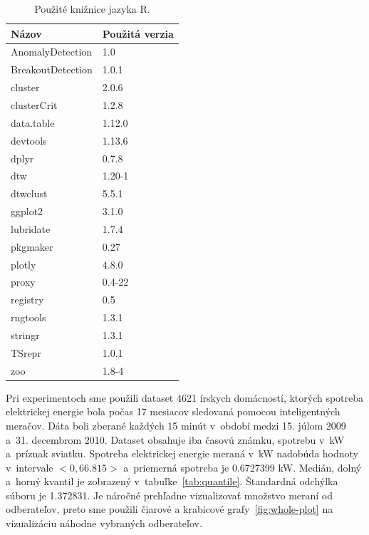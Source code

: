 \documentclass[a4paper,twoside,slovak,12pt,appendix]{article}
\begin{document}
\begin{table}[ht]
  \centering
  \caption{Použité knižnice jazyka R.}
  \label{tab:libraries}
  \begin{tabular}{|l|l|}
    \hline
    \textbf{Názov}  &   \textbf{Použitá verzia}  \\ \hline
    AnomalyDetection    &   1.0         \\ \hline
    BreakoutDetection   &   1.0.1       \\ \hline
    cluster             &   2.0.6       \\ \hline
    clusterCrit         &   1.2.8       \\ \hline
    data.table          &   1.12.0      \\ \hline
    devtools            &   1.13.6      \\ \hline
    dplyr               &   0.7.8       \\ \hline
    dtw                 &   1.20-1      \\ \hline
    dtwclust            &   5.5.1       \\ \hline
    ggplot2             &   3.1.0       \\ \hline
    lubridate           &   1.7.4       \\ \hline
    pkgmaker            &   0.27        \\ \hline
    plotly              &   4.8.0       \\ \hline
    proxy               &   0.4-22      \\ \hline
    registry            &   0.5         \\ \hline
    rngtools            &   1.3.1       \\ \hline
    stringr             &   1.3.1       \\ \hline
    TSrepr              &   1.0.1       \\ \hline
    zoo                 &   1.8-4       \\ \hline
  \end{tabular}
\end{table}

Pri experimentoch sme použili dataset 4621 írskych domácností, ktorých spotreba
elektrickej energie bola počas 17 mesiacov sledovaná pomocou inteligentných
meračov. Dáta boli zberané každých 15 minút v~období medzi 15. júlom 2009 a~31.
decembrom 2010. Dataset obsahuje iba časovú známku, spotrebu v~kW a~príznak
sviatku. Spotreba elektrickej energie meraná v~kW nadobúda hodnoty v~intervale
$<0, 66.815>$ a~priemerná spotreba je 0.6727399 kW. Medián, dolný a~horný
kvantil je zobrazený v~tabuľke~\ref{tab:quantile}. Štandardná odchýlka súboru
je 1.372831. Je náročné prehľadne vizualizovať množstvo meraní od odberateľov,
preto sme použili čiarové a krabicové grafy~\ref{fig:whole-plot} na vizualizáciu
náhodne vybraných odberateľov.
\end{document}
